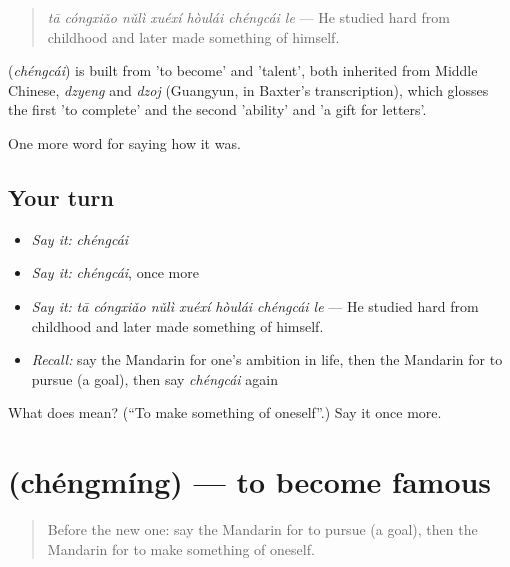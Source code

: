 \begin{quote}
\emph{tā cóngxiǎo nǔlì xuéxí hòulái chéngcái le} — He studied hard from childhood and later made something of himself.
\end{quote}

\begin{cousinweb}
\textbf{} (\emph{chéngcái}) is built from  'to become' and  'talent', both inherited from Middle Chinese, \emph{dzyeng} and \emph{dzoj} (Guangyun, in Baxter's transcription), which glosses the first 'to complete' and the second 'ability' and 'a gift for letters'.
\end{cousinweb}

\begin{grammarlens}[title={What you've built}]
One more word for saying how it was.
\end{grammarlens}

\subsection*{Your turn}
\begin{itemize}
\raggedright
  \item \emph{Say it:} \emph{chéngcái}
  \item \emph{Say it:} \emph{chéngcái}, once more
  \item \emph{Say it:} \emph{tā cóngxiǎo nǔlì xuéxí hòulái chéngcái le} — He studied hard from childhood and later made something of himself.
  \item \emph{Recall:} say the Mandarin for one's ambition in life, then the Mandarin for to pursue (a goal), then say \emph{chéngcái} again
\end{itemize}

\begin{tcolorbox}[breakable,colback=teal!4,colframe=teal!35!black,title={Before you move on}]
What does  mean? (\textquotedblleft{}To make something of oneself\textquotedblright{}.) Say it once more.
\end{tcolorbox}
\section[\texorpdfstring{\zh{成名} (chéngmíng)}{成名 (chéngmíng)}]{ (chéngmíng) — to become famous}

\label{lesson:ZH-C512-chengming}



\begin{quote}
Before the new one: say the Mandarin for to pursue (a goal), then the Mandarin for to make something of oneself.
\end{quote}

